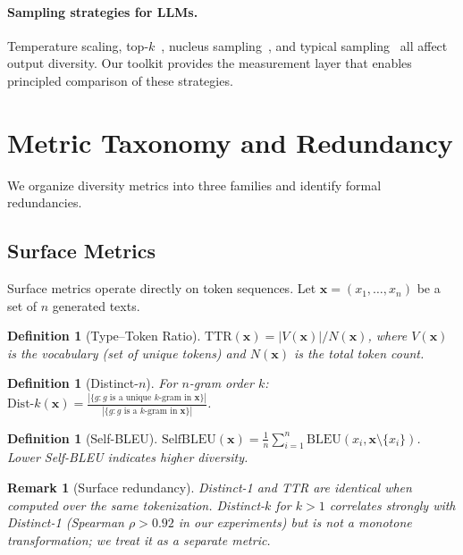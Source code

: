 \documentclass[11pt,a4paper]{article}
\newtheorem{definition}[theorem]{Definition}
\newtheorem{remark}[theorem]{Remark}
\begin{document}
\paragraph{Sampling strategies for LLMs.}
Temperature scaling, top-$k$~\citep{fan2018hierarchical},
nucleus sampling~\citep{holtzman2020curious}, and
typical sampling~\citep{meister2023locally} all affect
output diversity.  Our toolkit provides the measurement
layer that enables principled comparison of these
strategies.

\section{Metric Taxonomy and Redundancy}\label{sec:taxonomy}

We organize diversity metrics into three families and
identify formal redundancies.

\subsection{Surface Metrics}

Surface metrics operate directly on token sequences.
Let $\mathbf{x} = (x_1, \ldots, x_n)$ be a set of $n$
generated texts.

\begin{definition}[Type--Token Ratio]
$\mathrm{TTR}(\mathbf{x}) = |V(\mathbf{x})| / N(\mathbf{x})$,
where $V(\mathbf{x})$ is the vocabulary (set of unique tokens)
and $N(\mathbf{x})$ is the total token count.
\end{definition}

\begin{definition}[Distinct-$n$]
For $n$-gram order $k$:
$\mathrm{Dist}\text{-}k(\mathbf{x}) =
\frac{|\{g : g \text{ is a unique $k$-gram in } \mathbf{x}\}|}
     {|\{g : g \text{ is a $k$-gram in } \mathbf{x}\}|}$.
\end{definition}

\begin{definition}[Self-BLEU]
$\mathrm{SelfBLEU}(\mathbf{x}) =
\frac{1}{n} \sum_{i=1}^{n}
\mathrm{BLEU}(x_i, \mathbf{x} \setminus \{x_i\})$.
Lower Self-BLEU indicates higher diversity.
\end{definition}

\begin{remark}[Surface redundancy]
Distinct-1 and TTR are identical when computed over the
same tokenization.  Distinct-$k$ for $k > 1$ correlates
strongly with Distinct-1 (Spearman $\rho > 0.92$ in our
experiments) but is not a monotone transformation; we
treat it as a separate metric.
\end{remark}
\end{document}
